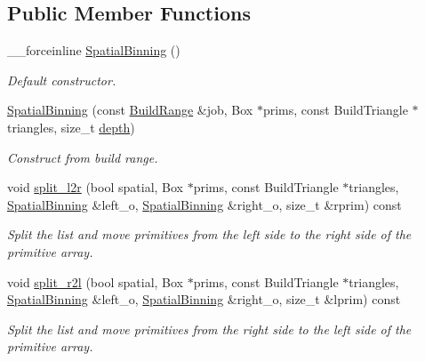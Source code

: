 \subsection*{Public Member Functions}
\begin{DoxyCompactItemize}
\item 
\_\-\_\-forceinline \hyperlink{classembree_1_1_spatial_binning_abaa0256d09fa6e70ec3f846d109de6c1}{SpatialBinning} ()
\begin{DoxyCompactList}\small\item\em Default constructor. \item\end{DoxyCompactList}\item 
\hyperlink{classembree_1_1_spatial_binning_a347bab70e79de373c23a924490428241}{SpatialBinning} (const \hyperlink{structembree_1_1_build_range}{BuildRange} \&job, Box $\ast$prims, const BuildTriangle $\ast$triangles, size\_\-t \hyperlink{classembree_1_1_spatial_binning_a99c86e2b94dc1c23e6309860571db996}{depth})
\begin{DoxyCompactList}\small\item\em Construct from build range. \item\end{DoxyCompactList}\item 
void \hyperlink{classembree_1_1_spatial_binning_afd0297032faf28126ce5d5bd1becf753}{split\_\-l2r} (bool spatial, Box $\ast$prims, const BuildTriangle $\ast$triangles, \hyperlink{classembree_1_1_spatial_binning}{SpatialBinning} \&left\_\-o, \hyperlink{classembree_1_1_spatial_binning}{SpatialBinning} \&right\_\-o, size\_\-t \&rprim) const 
\begin{DoxyCompactList}\small\item\em Split the list and move primitives from the left side to the right side of the primitive array. \item\end{DoxyCompactList}\item 
void \hyperlink{classembree_1_1_spatial_binning_ad56a26ee1beda2a56215f18da89ddf3f}{split\_\-r2l} (bool spatial, Box $\ast$prims, const BuildTriangle $\ast$triangles, \hyperlink{classembree_1_1_spatial_binning}{SpatialBinning} \&left\_\-o, \hyperlink{classembree_1_1_spatial_binning}{SpatialBinning} \&right\_\-o, size\_\-t \&lprim) const 
\begin{DoxyCompactList}\small\item\em Split the list and move primitives from the right side to the left side of the primitive array. \item\end{DoxyCompactList}\end{DoxyCompactItemize}
